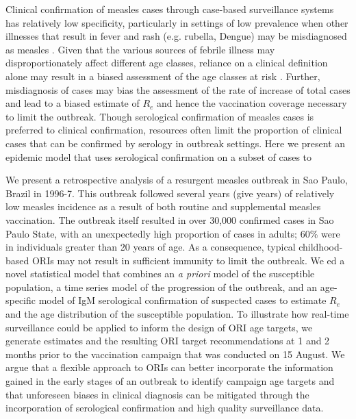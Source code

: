 Clinical confirmation of measles cases through case-based surveillance systems has relatively low specificity,
particularly in settings of low prevalence \cite{Hutchins_2004,Ho_2014,GUY_2004} when other illnesses that result in fever and
rash (e.g. rubella, Dengue) may be misdiagnosed as measles \cite{Ho_2014}. Given that the various sources of febrile illness may
disproportionately affect different age classes, reliance on a clinical
definition alone may result in a biased assessment of the age classes at
risk \cite{Hutchins_2004,Durrheim_2014}. Further, misdiagnosis of
cases may bias the assessment of the rate of increase of total cases and
lead to a biased estimate of \(R_{e}\) and hence the vaccination
coverage necessary to limit the outbreak. Though serological
confirmation of measles cases is preferred to clinical confirmation,
resources often limit the proportion of clinical cases that can be
confirmed by serology in outbreak settings. Here we present an epidemic
model that uses serological confirmation on a subset of cases to

We present a retrospective analysis of a resurgent measles outbreak in
Sao Paulo, Brazil in 1996-7. This outbreak followed several years (give years) of
relatively low measles incidence as a result of both routine and
supplemental measles vaccination. The outbreak itself resulted in over
30,000 confirmed cases in Sao Paulo State, with an unexpectedly high
proportion of cases in adults; 60\% were in individuals greater than 20
years of age. As a consequence, typical childhood-based ORIs may not result in sufficient immunity to limit the outbreak. We
ed a novel statistical model that combines an \emph{a priori} model
of the susceptible population, a time series model of the progression of
the outbreak, and an age-specific model of IgM serological confirmation
of suspected cases to estimate \(R_{e}\)and the age distribution of the
susceptible population. To illustrate how real-time surveillance could
be applied to inform the design of ORI age targets, we generate
estimates and the resulting ORI target recommendations at 1
and 2 months prior to the vaccination campaign that was
conducted on 15 August. We argue that a flexible approach to ORIs can
better incorporate the information gained in the early stages of an
outbreak to identify campaign age targets and that unforeseen biases in
clinical diagnosis can be mitigated through the incorporation of
serological confirmation and high quality surveillance data.